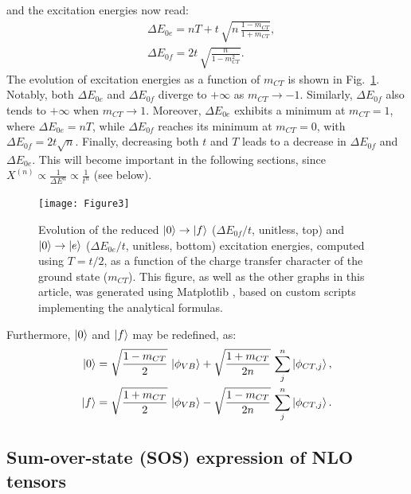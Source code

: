 \documentclass[USenglish]{article}
\begin{document}
and the excitation energies now read:\begin{align}
	&\Delta E_{0e}= nT + t\,\sqrt{n\,\frac{1-m_{CT}}{1+m_{CT}}}, \nonumber\\
	&\Delta E_{0f} = 2t\,\sqrt{\frac{n}{1-m_{CT}^2}}. \label{eq:energiesmct}
\end{align}
The evolution of excitation energies as a function of $m_{CT}$ is shown in Fig.~\ref{fig:eexci}. Notably, both $\Delta E_{0e}$ and $\Delta E_{0f}$ diverge to $+\infty$ as $m_{CT} \to -1$. Similarly, $\Delta E_{0f}$ also tends to $+\infty$ when $m_{CT} \to 1$.  
Moreover, $\Delta E_{0e}$ exhibits a minimum at $m_{CT} = 1$, where $\Delta E_{0e} = nT$, while $\Delta E_{0f}$ reaches its minimum at $m_{CT} = 0$, with $\Delta E_{0f} = 2t\sqrt{n}$. Finally, decreasing both $t$ and $T$ leads to a decrease in $\Delta E_{0f}$ and $\Delta E_{0e}$. This will become important in the following sections, since $X^{(n)} \propto \frac{1}{\Delta E^n} \propto \frac{1}{t^n}$ (see below).

\begin{figure}[!h]
	\texttt{[image: Figure3]}
	\caption{Evolution of the reduced $\ket{0}\rightarrow\ket{f}$ ($\Delta E_{0f} / t$, unitless, top) and $\ket{0}\rightarrow\ket{e}$ ($\Delta E_{0e} /t$, unitless, bottom) excitation energies, computed using $T = t/2$, as a function of the charge transfer character of the ground state ($m_{CT}$). This figure, as well as the other graphs in this article, was generated using Matplotlib \cite{Hunter:2007}, based on custom scripts implementing the analytical formulas.}
	\label{fig:eexci}
\end{figure}

Furthermore, $\ket{0}$ and $\ket{f}$ may be redefined, as:\begin{align}
\ket{0} &= \sqrt{\frac{1-m_{CT}}{2}}\,\ket{\phi_{VB}} + \sqrt{\frac{1+m_{CT}}{2n}}\,\sum_j^n \ket{\phi_{CT,j}},\nonumber\\
\ket{f} &= \sqrt{\frac{1+m_{CT}}{2}}\,\ket{\phi_{VB}} - \sqrt{\frac{1-m_{CT}}{2n}}\,\sum_j^n \ket{\phi_{CT,j}}.
\end{align}

\clearpage

\subsection{Sum-over-state (SOS) expression of NLO tensors}
\end{document}
